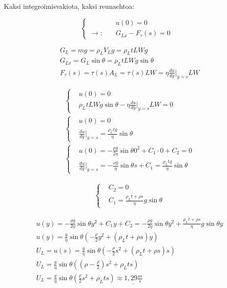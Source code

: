 \documentclass[12pt,a4paper,finnish]{article}
\begin{document}
Kaksi integroimisvakiota, kaksi reunaehtoa:

\begin{equation}
 \left\{
 \begin{aligned}
  &u(0) = 0\\
  \rightarrow: \quad &G_{Lx} - F_{\tau}(s) = 0
 \end{aligned}\right.
\end{equation}

\begin{align}
 &G_L = mg = \rho_L V_L g = \rho_L tLW g\\
 &G_{Lx} = G_L\sin\theta = \rho_L tLW g\sin\theta\\
 &F_{\tau}(s) = \tau(s)A_L = \tau(s)LW = \eta \frac{du}{dy}\bigg|_{y=s}LW
\end{align}

\begin{align}
 &\left\{
 \begin{aligned}
  &u(0) = 0\\
  &\rho_L tLW g\sin\theta - \eta \frac{du}{dy}\bigg|_{y=s}LW = 0
 \end{aligned}\right.\\
 &\left\{
 \begin{aligned}
  &u(0) = 0\\
  &\frac{du}{dy}\bigg|_{y=s} = \frac{\rho_L tg}{\eta} \sin\theta
 \end{aligned}\right.\\
 &\left\{
 \begin{aligned}
  &u(0) = -\frac{\rho g}{2\eta}\sin\theta 0^2 + C_1\cdot0 + C_2 = 0\\
  &\frac{du}{dy}\bigg|_{y=s} = -\frac{\rho g}{\eta}\sin\theta s + C_1 = \frac{\rho_L tg}{\eta} \sin\theta
 \end{aligned}\right.
\end{align}

\begin{align}
 &\left\{
 \begin{aligned}
  &C_2 = 0\\
  &C_1 = \frac{\rho_L t + \rho s}{\eta} g\sin\theta
 \end{aligned}\right.
\end{align}

\begin{align}
 &u(y) = -\frac{\rho g}{2\eta}\sin\theta y^2 + C_1y + C_2 = -\frac{\rho g}{2\eta}\sin\theta y^2 + \frac{\rho_L t + \rho s}{\eta} g\sin\theta y\\
 &u(y) = \frac{g}{\eta}\sin\theta \left(-\frac{\rho}{2}y^2 + (\rho_L t + \rho s) y\right)\\
 &U_L = u(s) = \frac{g}{\eta}\sin\theta \left(-\frac{\rho}{2}s^2 + (\rho_L t + \rho s) s\right)\\
 &U_L = \frac{g}{\eta}\sin\theta \left(\left(\rho -\frac{\rho}{2}\right)s^2 + \rho_L t s\right)\\
 &U_L = \frac{g}{\eta}\sin\theta \left(\frac{\rho}{2}s^2 + \rho_L t s\right) \approx \underline{1,29 \frac{m}{s}}
\end{align}
\end{document}
